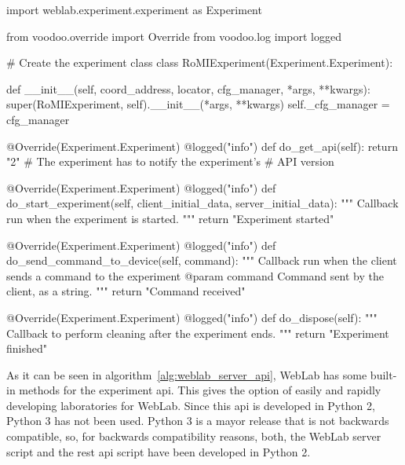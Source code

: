 \clearpage
\begin{center}
\begin{minipage}{.9\textwidth}
\singlespace
{}
\begin{pyglist}[language=python, caption={WebLab experiment server development.},
	label={alg:weblab_server_api}, listingname={Algorithm}, numbers=left]
import weblab.experiment.experiment as Experiment

from voodoo.override import Override
from voodoo.log import logged

# Create the experiment class
class RoMIExperiment(Experiment.Experiment):

    def __init__(self, coord_address, locator, cfg_manager,
    *args, **kwargs):
        super(RoMIExperiment, self).__init__(*args, **kwargs)
        self._cfg_manager = cfg_manager

    @Override(Experiment.Experiment)
    @logged("info")
    def do_get_api(self):
        return "2" # The experiment has to notify the experiment's
                   # API version

    @Override(Experiment.Experiment)
    @logged("info")
    def do_start_experiment(self, client_initial_data,
    server_initial_data):
        """
        Callback run when the experiment is started.
        """
        return "Experiment started"

    @Override(Experiment.Experiment)
    @logged("info")
    def do_send_command_to_device(self, command):
        """
        Callback run when the client sends a command to the experiment
        @param command Command sent by the client, as a string.
        """
        return "Command received"

    @Override(Experiment.Experiment)
    @logged("info")
    def do_dispose(self):
        """
        Callback to perform cleaning after the experiment ends.
        """
        return "Experiment finished"
\end{pyglist}
\end{minipage}
\end{center}
\clearpage

As it can be seen in algorithm~\ref{alg:weblab_server_api}, WebLab has some built-in methods for the
experiment \acrshort{api}. This gives the option of easily and rapidly developing laboratories for
WebLab. Since this \acrshort{api} is developed in Python 2, Python 3 has not been used. Python 3 is
a mayor release that is not backwards compatible, so, for backwards compatibility reasons, both, the
WebLab server script and the \acrshort{rest} \acrshort{api} script have been developed in Python 2.

